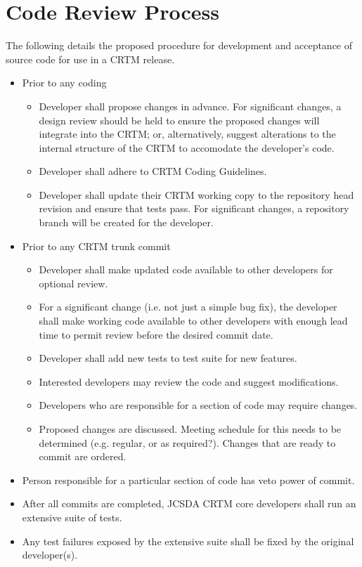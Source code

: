 \section{Code Review Process}
\label{sec:code_review_process}
The following details the proposed procedure for development and acceptance of source code for use in a CRTM release.
\begin{itemize}
  \item Prior to any coding
  \begin{itemize}
    \item Developer shall propose changes in advance. For significant changes, a design review should be held to ensure the proposed changes will integrate into the CRTM; or, alternatively, suggest alterations to the internal structure of the CRTM to accomodate the developer's code.
    \item Developer shall adhere to CRTM Coding Guidelines\cite{CRTM_Coding_Guidelines}.
    \item Developer shall update their CRTM working copy to the repository head revision and ensure that tests pass. For significant changes, a repository branch will be created for the developer.
  \end{itemize}
  \item Prior to any CRTM trunk commit
  \begin{itemize}
    \item Developer shall make updated code available to other developers for optional review.
    \item For a significant change (i.e. not just a simple bug fix), the developer shall make working code available to other developers with enough lead time to permit review before the desired commit date.
    \item Developer shall add new tests to test suite for new features.
    \item Interested developers may review the code and suggest modifications.
    \item Developers who are responsible for a section of code may require changes.
    \item Proposed changes are discussed. Meeting schedule for this needs to be determined (e.g. regular, or as required?). Changes that are ready to commit are ordered.
  \end{itemize}
  \item Person responsible for a particular section of code has veto power of commit.
  \item After all commits are completed, JCSDA CRTM core developers shall run an extensive suite of tests.
  \item Any test failures exposed by the extensive suite shall be fixed by the original developer(s).
\end{itemize}


